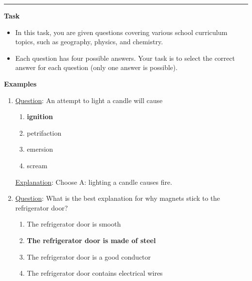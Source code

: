 \documentclass[11pt]{article}
\begin{document}
\begin{table*}[pt!]
\scriptsize

\begin{minipage}[t]{.43\linewidth}
\par\noindent\rule{\textwidth}{1pt}

\vspace{.5cm}

\textbf{Task}
\vspace{0.05cm}
\begin{itemize}[noitemsep,topsep=0.1pt]
    \item In this task, you are given questions covering various school curriculum topics, such as geography, physics, and chemistry.
    \item Each question has four possible answers. Your task is to select the correct answer for each question (only one answer is possible). 
\end{itemize}

\vspace{0.2cm}
\textbf{Examples}
\vspace{0.05cm}

\begin{enumerate}[topsep=0.1pt,noitemsep]
    \item \underline{Question}: An attempt to light a candle will cause 

\begin{enumerate}[label=\Alph*,topsep=0.1pt,noitemsep]
    \item \textbf{ignition}
    \item petrifaction
    \item emersion
    \item scream
\end{enumerate}

\noindent \underline{Explanation}: Choose A: lighting a candle causes fire.

    \item \noindent \underline{Question}: What is the best explanation for why magnets stick to the refrigerator door?
    
    \begin{enumerate}[label=\Alph*,topsep=0.1pt,noitemsep]
        \item The refrigerator door is smooth
        \item \textbf{The refrigerator door is made of steel}
        \item The refrigerator door is a good conductor
        \item The refrigerator door contains electrical wires
    \end{enumerate}
    

\end{enumerate}
\end{minipage}
\end{table*}
\end{document}
